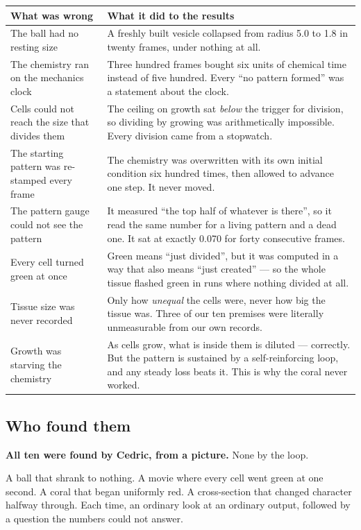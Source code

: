 \documentclass[11pt,a4paper]{article}
\begin{document}
\begin{center}\small
\begin{tabular}{@{}p{6.2cm}p{8.6cm}@{}}
\toprule
\textbf{What was wrong} & \textbf{What it did to the results} \\
\midrule
The ball had no resting size &
  A freshly built vesicle collapsed from radius 5.0 to 1.8 in twenty frames, under nothing at all. \\
The chemistry ran on the mechanics clock &
  Three hundred frames bought six units of chemical time instead of five hundred. Every ``no
  pattern formed'' was a statement about the clock. \\
Cells could not reach the size that divides them &
  The ceiling on growth sat \emph{below} the trigger for division, so dividing by growing was
  arithmetically impossible. Every division came from a stopwatch. \\
The starting pattern was re-stamped every frame &
  The chemistry was overwritten with its own initial condition six hundred times, then allowed to
  advance one step. It never moved. \\
The pattern gauge could not see the pattern &
  It measured ``the top half of whatever is there'', so it read the same number for a living
  pattern and a dead one. It sat at exactly 0.070 for forty consecutive frames. \\
Every cell turned green at once &
  Green means ``just divided'', but it was computed in a way that also means ``just created'' ---
  so the whole tissue flashed green in runs where nothing divided at all. \\
Tissue size was never recorded &
  Only how \emph{unequal} the cells were, never how big the tissue was. Three of our ten premises
  were literally unmeasurable from our own records. \\
Growth was starving the chemistry &
  As cells grow, what is inside them is diluted --- correctly. But the pattern is sustained by a
  self-reinforcing loop, and any steady loss beats it. This is why the coral never worked. \\
\bottomrule
\end{tabular}
\end{center}

\subsection{Who found them}

\begin{tcolorbox}[colback=warn!8,colframe=warn!55,boxrule=0.8pt,arc=2pt]
\textbf{All ten were found by Cedric, from a picture.} None by the loop.

A ball that shrank to nothing. A movie where every cell went green at one second. A coral that
began uniformly red. A cross-section that changed character halfway through. Each time, an
ordinary look at an ordinary output, followed by a question the numbers could not answer.
\end{tcolorbox}
\end{document}
